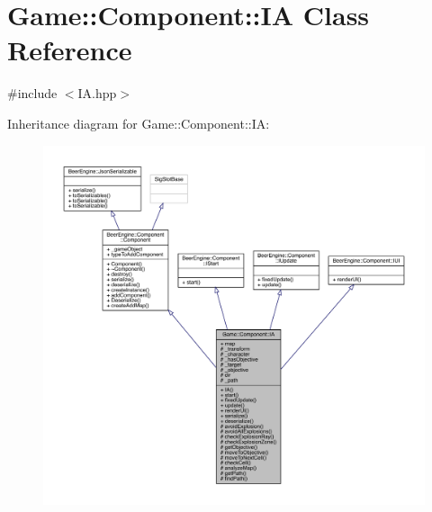 \hypertarget{class_game_1_1_component_1_1_i_a}{}\section{Game\+:\+:Component\+:\+:IA Class Reference}
\label{class_game_1_1_component_1_1_i_a}


{\ttfamily \#include $<$I\+A.\+hpp$>$}



Inheritance diagram for Game\+:\+:Component\+:\+:IA\+:\nopagebreak
\begin{figure}[H]
\begin{center}
\leavevmode
\includegraphics[width=350pt]{class_game_1_1_component_1_1_i_a__inherit__graph}
\end{center}
\end{figure}


